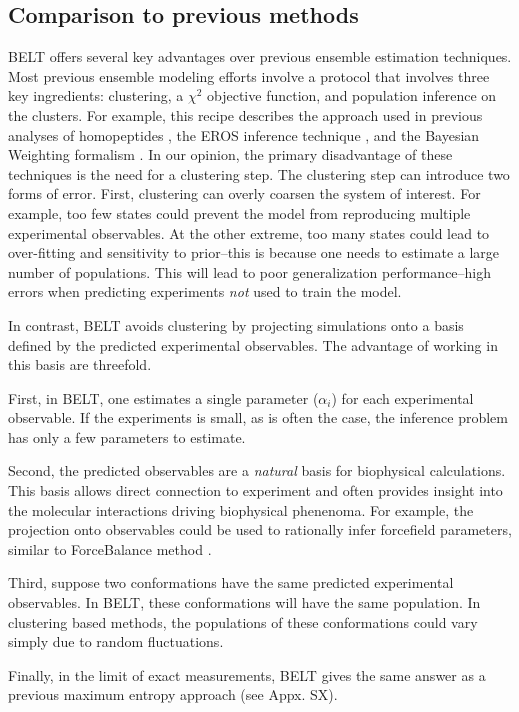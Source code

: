 \documentclass[journal=jacsat,manuscript=article]{achemso}
\begin{document}
\subsection{Comparison to previous methods}

BELT offers several key advantages over previous ensemble estimation techniques.  Most previous ensemble modeling efforts involve a protocol that involves three key ingredients: clustering, a $\chi^2$ objective function, and population inference on the clusters.  For example, this recipe describes the approach used in previous analyses of homopeptides \cite{Graf2007}, the EROS inference technique \cite{rozycki2011saxs}, and the Bayesian Weighting formalism \cite{fisher2010}.  In our opinion, the primary disadvantage of these techniques is the need for a clustering step.  The clustering step can introduce two forms of error.  First, clustering can overly coarsen the system of interest.  For example, too few states could prevent the model from reproducing multiple experimental observables.  At the other extreme, too many states could lead to over-fitting and sensitivity to prior--this is because one needs to estimate a large number of populations.  This will lead to poor generalization performance--high errors 
when predicting experiments \emph{not} used to train the model.  

In contrast, BELT avoids clustering by projecting simulations onto a basis defined by the predicted experimental observables.  The advantage of working in this basis are threefold.  

First, in BELT, one estimates a single parameter ($\alpha_i$) for each experimental observable.  If the experiments is small, as is often the case, the inference problem has only a few parameters to estimate.  

Second, the predicted observables are a \emph{natural} basis for biophysical calculations.  This basis allows direct connection to experiment and often provides insight into the molecular interactions driving biophysical phenenoma.  For example, the projection onto observables could be used to rationally infer forcefield parameters, similar to ForceBalance method \cite{LeePing}.  

Third, suppose two conformations have the same predicted experimental observables.  In BELT, these conformations will have the same population.  In clustering based methods, the populations of these conformations could vary simply due to random fluctuations.  

Finally, in the limit of exact measurements, BELT gives the same answer as a previous \cite{chodera2012} maximum entropy approach (see Appx. SX).  
\end{document}
